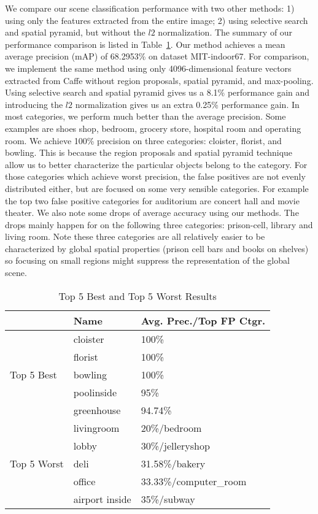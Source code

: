 We compare our scene classification performance with two other methods: 1) using only the
features extracted from the entire image; 2) using selective search and spatial pyramid, but without the
$l2$ normalization. The summary of our performance comparison is listed in Table~\ref{tab:overall}.
Our method achieves a mean average precision (mAP) of 68.2953\% on dataset
MIT-indoor67. For comparison, we implement the same method using only 4096-dimensional
feature vectors extracted from Caffe without region proposals, spatial pyramid, and max-pooling.
Using selective search and spatial pyramid gives us a 8.1\% performance gain and introducing
the $l2$ normalization gives us an extra 0.25\% performance gain. In most categories, we perform much
better than the average precision. Some examples are shoes shop, bedroom, grocery store, hospital room and operating
room. We achieve 100\% precision on three categories: cloister, florist, and bowling. This is because the region proposals and spatial pyramid technique
allow us to better characterize the particular objects belong to the category. For those categories which achieve worst precision, the false positives are
not evenly distributed either, but are focused on some very sensible categories. For example the top two false positive categories for auditorium are concert hall
and movie theater.
We also note some drops of average accuracy using our methods. The drops mainly happen for on the following three categories: prison-cell, library and living room.
Note these three categories are all relatively easier to be characterized by global spatial properties (prison cell bars and books on shelves) so focusing on small regions
might suppress the representation of the global scene.

\begin{table}[ht]
        \caption{Top 5 Best and Top 5 Worst Results}
        \centering
        \begin{tabular}{l l l}
        \hline \hline
        & Name           & Avg. Prec./Top FP Ctgr. \\ \hline
        \multirow{5}{*}{Top 5 Best}
        & cloister       & 100\% \\
        & florist        & 100\% \\
        & bowling        & 100\% \\
        & poolinside     & 95\% \\
        & greenhouse     & 94.74\% \\
        \hline
        \multirow{5}{*}{Top 5 Worst}
        & livingroom     & 20\%/bedroom \\
        & lobby          & 30\%/jelleryshop \\
        & deli           & 31.58\%/bakery \\
        & office         & 33.33\%/computer\_room \\
        & airport inside & 35\%/subway \\
        \hline
        \end{tabular}
        \label{tab:overall}
\end{table}


